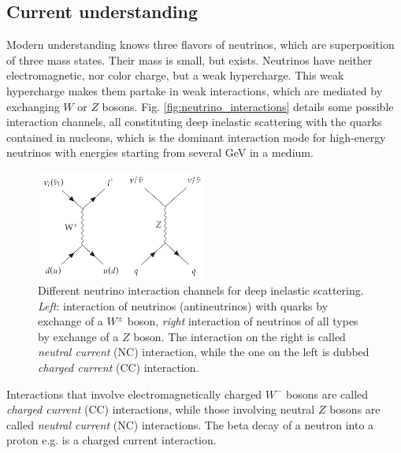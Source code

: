 \documentclass[
    a4paper, %
    fontsize=10pt, %
    twoside=false, %
    numbers=noenddot, %
    fontmethod=tex,
]{kaobook}
\begin{document}
\subsection{Current understanding} \label{neutrinos_current}
Modern understanding knows three flavors of neutrinos, which are superposition of three mass states. Their mass is small, but exists. Neutrinos have neither electromagnetic, nor color charge, but a weak hypercharge. This weak hypercharge makes them partake in weak interactions, which are mediated by exchanging $W$ or $Z$ bosons. Fig. \ref{fig:neutrino_interactions} details some possible interaction channels, all constituting deep inelastic scattering with the quarks contained in nucleons, which is the dominant interaction mode for high-energy neutrinos with energies starting from several \unit{\giga\eV} in a medium.

\begin{figure}[htb]
    \includegraphics[width=0.5\textwidth]{theory/neutrino_interactions_feynman_short.pdf}
    \caption[Neutrino interactions]{Different neutrino interaction channels for deep inelastic scattering. \textit{Left}: interaction of neutrinos (antineutrinos) with quarks by exchange of a $W^{\pm}$ boson, \textit{right} interaction of neutrinos of all types by exchange of a $Z$ boson. The interaction on the right is called \textit{neutral current} (NC) interaction, while the one on the left is dubbed \textit{charged current} (CC) interaction.}
\end{figure}

Interactions that involve electromagnetically charged $W^-$ bosons are called \textit{charged current} (CC) interactions, while those involving neutral $Z$ bosons are called \textit{neutral current} (NC) interactions. The beta decay of a neutron into a proton e.g. is a charged current interaction.
\end{document}
